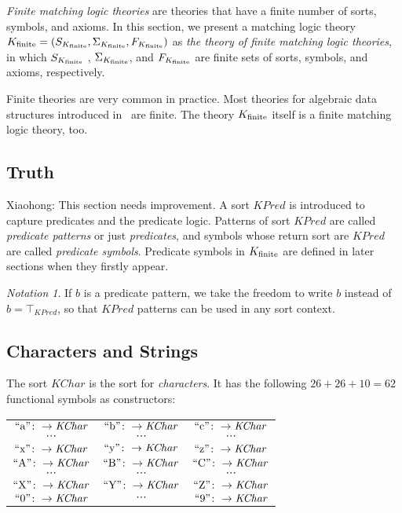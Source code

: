 \documentclass[UTF8,11pt]{article}
\newcounter{thmcounter}
\theoremstyle{plain}
\theoremstyle{definition}
\theoremstyle{remark}
\newtheorem{notation}   [thmcounter]{Notation}
\newcommand{\KPred}{\mathit{KPred}}
\newcommand{\KChar}{\mathit{KChar}}
\newcommand{\quot}[1]{\mathrm{``#1"}}
\begin{document}

\emph{Finite matching logic theories} are theories that have a finite number of sorts, symbols, and axioms.
In this section, we present a matching logic theory ${K_\text{finite}} = ( S_{K_\text{finite}}, \Sigma_{K_\text{finite}}, F_{K_\text{finite}} )$ as \emph{the theory of finite matching logic theories}, in which $S_{K_\text{finite}}$ , $\Sigma_{K_\text{finite}}$, and $F_{K_\text{finite}}$ are finite sets of sorts, symbols, and axioms, respectively.

Finite theories are very common in practice.
Most theories for algebraic data structures introduced in~\cite{rosu-2017-lmcs} are finite. The theory ${K_\text{finite}}$ itself is a finite matching logic theory, too.

\subsection{Truth}
\improvement
{Xiaohong: This section needs improvement.}
A sort $\KPred$ is introduced to capture predicates and the predicate logic.
Patterns of sort $\KPred$ are called \emph{predicate patterns} or just \emph{predicates}, and symbols whose return sort are $\KPred$ are called \emph{predicate symbols}. 
Predicate symbols in ${K_\text{finite}}$ are defined in later sections when they firstly appear.
\begin{notation}
	If $b$ is a predicate pattern, we take the freedom to write $b$ instead of $b = \top_\KPred$, so that $\KPred$ patterns can be used in any sort context.
\end{notation}





\subsection{Characters and Strings}
The sort $\KChar$ is the sort for \emph{characters}. It has the following $26 + 26 + 10 = 62$ functional symbols as constructors:
\begin{center}
	\begin{tabular}{c c c}
		$\quot{a} \colon \to \KChar$ & $\quot{b} \colon \to \KChar$ & $\quot{c} \colon \to \KChar$ \\
		$\cdots$ & $\cdots$ & $\cdots$ \\
		$\quot{x} \colon \to \KChar$ & $\quot{y} \colon \to \KChar$ & $\quot{z} \colon \to \KChar$ \\
		$\quot{A} \colon \to \KChar$ & $\quot{B} \colon \to \KChar$ & $\quot{C} \colon \to \KChar$ \\
		$\cdots$ & $\cdots$ & $\cdots$ \\
		$\quot{X} \colon \to \KChar$ & $\quot{Y} \colon \to \KChar$ & $\quot{Z} \colon \to \KChar$ \\
		$\quot{0} \colon \to \KChar$ & $\cdots$ & $\quot{9} \colon \to \KChar$ 
	\end{tabular}
\end{center}
\end{document}
